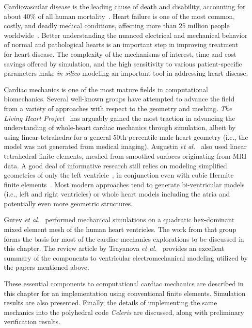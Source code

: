 Cardiovascular disease is the leading cause of death and disability, accounting for about 40$\%$ of all human mortality~\cite{genet_2015}. Heart failure is one of the most common, costly, and deadly medical conditions, affecting more than 25 million people worldwide~\cite{mann_2015}. Better understanding the nuanced electrical and mechanical behavior of normal and pathological hearts is an important step in improving treatment for heart disease. The complexity of the mechanisms of interest, time and cost savings offered by simulation, and the high sensitivity to various patient-specific parameters make \textit{in silico} modeling an important tool in addressing heart disease.

Cardiac mechanics is one of the most mature fields in computational biomechanics. Several well-known groups have attempted to advance the field from a variety of approaches with respect to the geometry and meshing. \textit{The Living Heart Project}~\cite{baillargeon_2014, genet_2015} has arguably gained the most traction in advancing the understanding of whole-heart cardiac mechanics through simulation, albeit by using linear tetrahedra for a general 50th percentile male heart geometry (i.e., the model was not generated from medical imaging). Augustin \textit{et al.}~\cite{augustin_2016} also used linear tetrahedral finite elements, meshed from smoothed surfaces originating from MRI data. A good deal of informative research still relies on modeling simplified geometries of only the left ventricle~\cite{guccione_2005, sack_2016}, in conjunction even with cubic Hermite finite elements~\cite{mcculloch_2000}. Most modern approaches tend to generate bi-ventricular models (i.e., left and right ventricles) or whole heart models including the atria and potentially even more geometric structures.

Gurev \textit{et al.}~\cite{gurev_2015} performed mechanical simulations on a quadratic hex-dominant mixed element mesh of the human heart ventricles. The work from that group forms the basis for most of the cardiac mechanics explorations to be discussed in this chapter. The review article by Trayanova \textit{et al.}~\cite{trayanova_2011} provides an excellent summary of the components to ventricular electromechanical modeling utilized by the papers mentioned above.

These essential components to computational cardiac mechanics are described in this chapter for an implementation using conventional finite elements. Simulation results are also presented. Finally, the details of implementing the same mechanics into the polyhedral code \textit{Celeris} are discussed, along with preliminary verification results.


